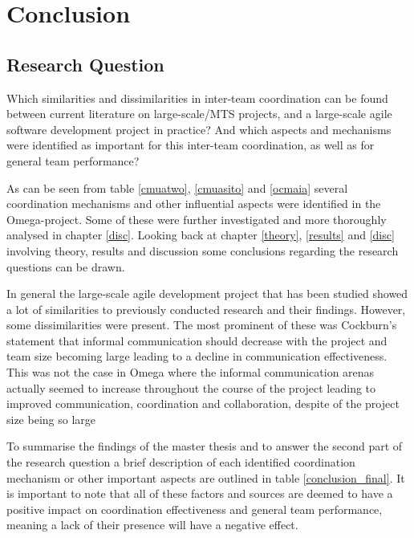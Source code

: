 \chapter{Conclusion}
\label{concl}

\minitoc

\newpage

\section{Research Question}

\begin{fancyquotes}
Which similarities and dissimilarities in inter-team coordination can be found between current literature on large-scale/MTS projects, and a large-scale agile software development project in practice? And which aspects and mechanisms were identified as important for this inter-team coordination, as well as for general team performance?
\end{fancyquotes}

As can be seen from table \ref{cmuatwo}, \ref{cmuasito} and  \ref{ocmaia} several coordination mechanisms and other influential aspects were identified in the Omega-project. Some of these were further investigated and more thoroughly analysed in chapter \ref{disc}. Looking back at chapter \ref{theory}, \ref{results} and \ref{disc} involving theory, results and discussion some conclusions regarding the research questions can be drawn.

In general the large-scale agile development project that has been studied showed a lot of similarities to previously conducted research and their findings. However, some dissimilarities were present. The most prominent of these was Cockburn's statement that informal communication should decrease with the project and team size becoming large leading to a decline in communication effectiveness. This was not the case in Omega where the informal communication arenas actually seemed to increase throughout the course of the project leading to improved communication, coordination and collaboration, despite of the project size being so large

To summarise the findings of the master thesis and to answer the second part of the research question a brief description of each identified coordination mechanism or other important aspects are outlined in  table \ref{conclusion_final}. It is important to note that all of these factors and sources are deemed to have a positive impact on coordination effectiveness and general team performance, meaning a lack of their presence will have a negative effect.


